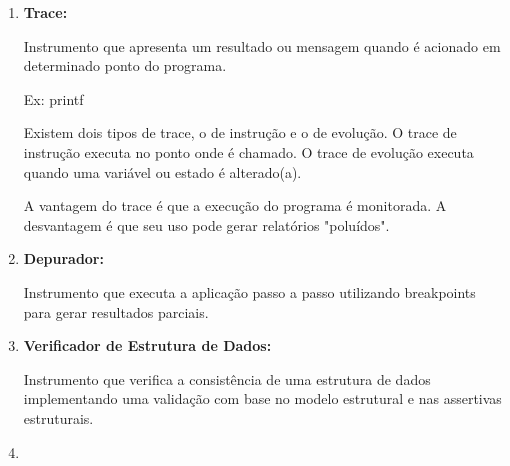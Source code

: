 \documentclass[
	12pt, %
]{fphw}
\begin{document}
\begin{doublespace}
\begin{enumerate}[label=\textbf{\arabic*})]
        \item \textbf{Trace:}
        
              Instrumento que apresenta um resultado ou mensagem quando é acionado em determinado ponto do programa.
              
              Ex: printf

              Existem dois tipos de trace, o de instrução e o de evolução. O trace de instrução executa no ponto onde é chamado. O trace de evolução executa quando uma variável ou estado é alterado(a).
              
              A vantagem do trace é que a execução do programa é monitorada. A desvantagem é que seu uso pode gerar relatórios "poluídos".

        \item \textbf{Depurador:}
        
              Instrumento que executa a aplicação passo a passo utilizando breakpoints para gerar resultados parciais.

        \item \textbf{Verificador de Estrutura de Dados:}
        
              Instrumento que verifica a consistência de uma estrutura de dados implementando uma validação com base no modelo estrutural e nas assertivas estruturais.

        \item \textbf{}

    \end{enumerate}


\end{doublespace}
\end{document}
